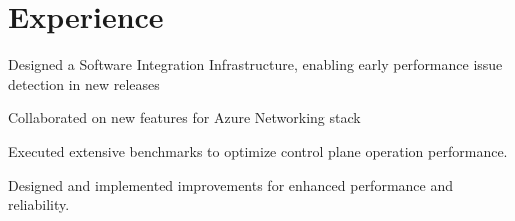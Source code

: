\documentclass[letterpaper]{deedy-resume} %
\begin{document}
\begin{minipage}[t]{0.66\textwidth} %


\section{Experience}


\vspace{\topsep} %
\begin{tightitemize}
\item Designed a Software Integration Infrastructure, enabling early performance issue detection in new releases
\item Collaborated on new features for Azure Networking stack
\item Executed extensive benchmarks to optimize control plane operation performance.
\item Designed and implemented improvements for enhanced performance and reliability.
\end{tightitemize}



\sectionspace %



\end{minipage}
\end{document}
